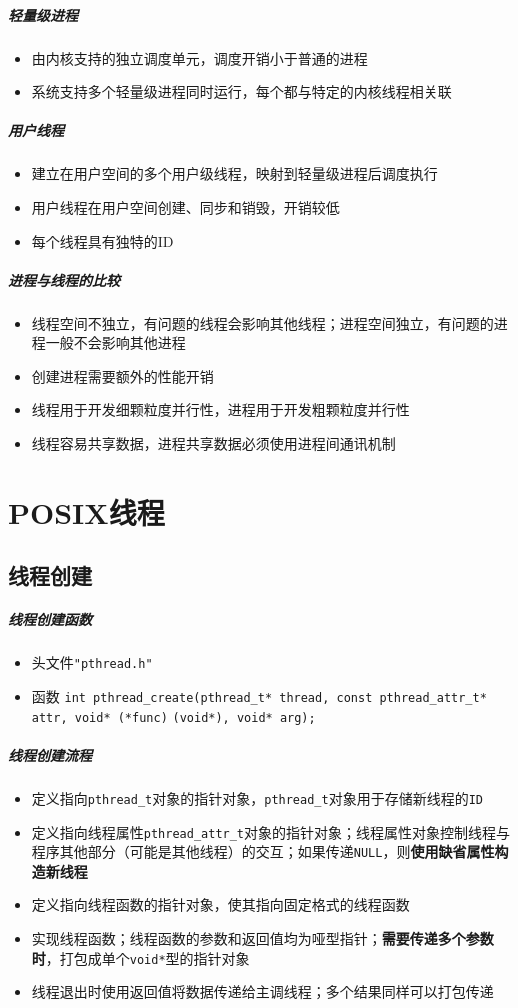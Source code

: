 \documentclass[UTF8,a4paper,12pt]{ctexbook}
\begin{document}
	\subparagraph{轻量级进程}
		\begin{itemize}[itemindent = 1em]
			\item 由内核支持的独立调度单元，调度开销小于普通的进程	
			\item 系统支持多个轻量级进程同时运行，每个都与特定的内核线程相关联
		\end{itemize}
	
	\subparagraph{用户线程}
		\begin{itemize}[itemindent = 1em]
			\item 	建立在用户空间的多个用户级线程，映射到轻量级进程后调度执行
			\item   用户线程在用户空间创建、同步和销毁，开销较低
			\item   每个线程具有独特的ID
		\end{itemize}
	
	\subparagraph{进程与线程的比较}
		\begin{itemize}[itemindent = 1em]
			\item 线程空间不独立，有问题的线程会影响其他线程；进程空间独立，有问题的进程一般不会影响其他进程	
			\item 创建进程需要额外的性能开销
			\item 线程用于开发细颗粒度并行性，进程用于开发粗颗粒度并行性
			\item 线程容易共享数据，进程共享数据必须使用进程间通讯机制
		\end{itemize}
	
\section{POSIX线程}
	\subsection{线程创建}
		\subparagraph{线程创建函数}
			\begin{itemize}[itemindent = 1em]
				\item 头文件\verb|"pthread.h"|
				\item 函数 \verb|int pthread_create(pthread_t* thread, const pthread_attr_t* attr, void* (*func)| \verb|(void*), void* arg);|
			\end{itemize}
		\subparagraph{线程创建流程}
			\begin{itemize}[itemindent = 1em]
				\item 定义指向\verb|pthread_t|对象的指针对象，\verb|pthread_t|对象用于存储新线程的\verb|ID|
				\item 定义指向线程属性\verb|pthread_attr_t|对象的指针对象；线程属性对象控制线程与程序其他部分（可能是其他线程）的交互；如果传递\verb|NULL|，则\textbf{使用缺省属性构造新线程}
				
				\item 定义指向线程函数的指针对象，使其指向固定格式的线程函数
				\item 实现线程函数；线程函数的参数和返回值均为哑型指针；\textbf{需要传递多个参数时}，打包成单个\verb|void*|型的指针对象
				\item 线程退出时使用返回值将数据传递给主调线程；多个结果同样可以打包传递
			\end{itemize}
			
\end{document}
